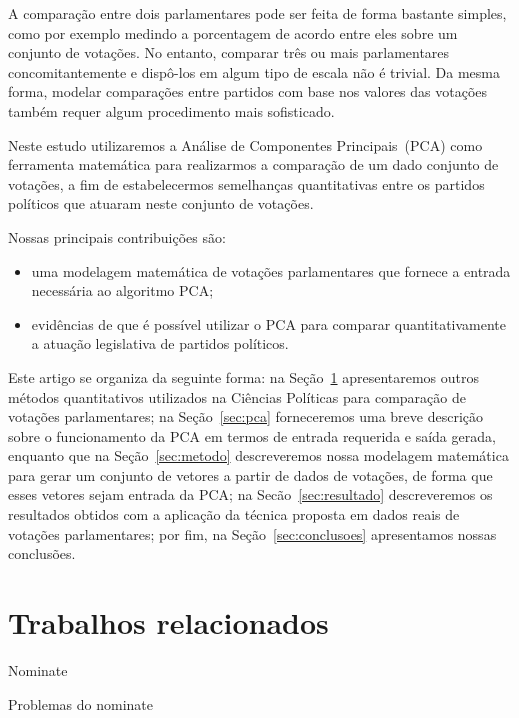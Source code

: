 \documentclass[a4paper, 12pt]{article}
\newcommand\pca{Análise de Componentes Principais}
\begin{document}
A comparação entre dois parlamentares pode ser feita de forma bastante simples, como por exemplo medindo a porcentagem de acordo entre eles sobre um conjunto de votações. No entanto, comparar três ou mais parlamentares concomitantemente e dispô-los em algum tipo de escala não é trivial. Da mesma forma, modelar comparações entre partidos com base nos valores das votações também requer algum procedimento mais sofisticado.

Neste estudo utilizaremos a \pca\ (PCA) como ferramenta matemática para realizarmos a comparação de um dado conjunto de votações, a fim de estabelecermos semelhanças quantitativas entre os partidos políticos que atuaram neste conjunto de votações.

Nossas principais contribuições são:

\begin{itemize}
 \item uma modelagem matemática de votações parlamentares que fornece a entrada necessária ao algoritmo PCA;
 \item evidências de que é possível utilizar o PCA para comparar quantitativamente a atuação legislativa de partidos políticos.
\end{itemize}


Este artigo se organiza da seguinte forma: na Seção~\ref{sec:relacionados} apresentaremos outros métodos quantitativos utilizados na Ciências Políticas para comparação de votações parlamentares; na Seção~\ref{sec:pca} forneceremos uma breve descrição sobre o funcionamento da PCA em termos de entrada requerida e saída gerada, enquanto que na Seção~\ref{sec:metodo} descreveremos nossa modelagem matemática para gerar um conjunto de vetores a partir de dados de votações, de forma que esses vetores sejam entrada da PCA; na Secão~\ref{sec:resultado} descreveremos os resultados obtidos com a aplicação da técnica proposta em dados reais de votações parlamentares; por fim, na Seção~\ref{sec:conclusoes} apresentamos nossas conclusões.  

\section{Trabalhos relacionados}
\label{sec:relacionados}

Nominate

Problemas do nominate

\end{document}
